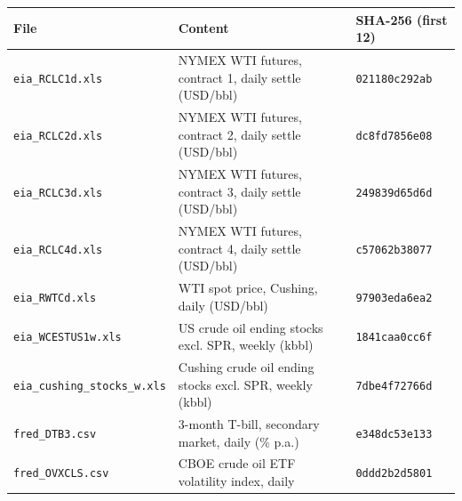 \begin{tabular}{@{}p{}p{}l@{}}
\toprule
File & Content & SHA-256 (first 12) \\
\midrule
\texttt{eia\_RCLC1d.xls} & NYMEX WTI futures, contract 1, daily settle (USD/bbl) & \texttt{021180c292ab} \\
\texttt{eia\_RCLC2d.xls} & NYMEX WTI futures, contract 2, daily settle (USD/bbl) & \texttt{dc8fd7856e08} \\
\texttt{eia\_RCLC3d.xls} & NYMEX WTI futures, contract 3, daily settle (USD/bbl) & \texttt{249839d65d6d} \\
\texttt{eia\_RCLC4d.xls} & NYMEX WTI futures, contract 4, daily settle (USD/bbl) & \texttt{c57062b38077} \\
\texttt{eia\_RWTCd.xls} & WTI spot price, Cushing, daily (USD/bbl) & \texttt{97903eda6ea2} \\
\texttt{eia\_WCESTUS1w.xls} & US crude oil ending stocks excl. SPR, weekly (kbbl) & \texttt{1841caa0cc6f} \\
\texttt{eia\_cushing\_stocks\_w.xls} & Cushing crude oil ending stocks excl. SPR, weekly (kbbl) & \texttt{7dbe4f72766d} \\
\texttt{fred\_DTB3.csv} & 3-month T-bill, secondary market, daily (\% p.a.) & \texttt{e348dc53e133} \\
\texttt{fred\_OVXCLS.csv} & CBOE crude oil ETF volatility index, daily & \texttt{0ddd2b2d5801} \\
\bottomrule
\end{tabular}
